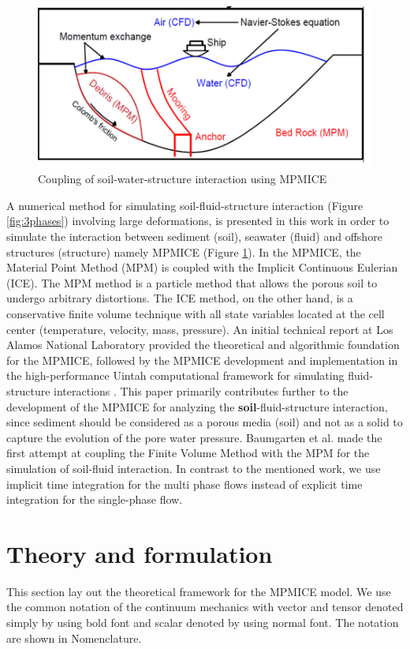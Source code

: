 \documentclass[preprint,12pt]{elsarticle}
\begin{document}
%
%
\begin{figure}[h]
\center
\includegraphics[scale=.4]{MPMICE.jpg}
\caption{Coupling of soil-water-structure interaction using MPMICE}
\label{fig:MPMICE}
\end {figure}
%
%

A numerical method for simulating soil-fluid-structure interaction (Figure \ref{fig:3phases}) involving large deformations, is presented in this work in order to simulate the interaction between sediment (soil), seawater (fluid) and offshore structures (structure) namely MPMICE (Figure \ref{fig:MPMICE}). In the MPMICE, the Material Point Method (MPM) is coupled with the Implicit Continuous Eulerian (ICE). The MPM method is a particle method that allows the porous soil to undergo arbitrary distortions. The ICE method, on the other hand, is a conservative finite volume technique with all state variables located at the cell center (temperature, velocity, mass, pressure). An initial technical report \cite{Kashiwa} at Los Alamos National Laboratory provided the theoretical and algorithmic foundation for the MPMICE, followed by the MPMICE development and implementation in the high-performance Uintah computational framework for simulating fluid-structure interactions \cite{MPMICE}. This paper primarily contributes further to the development of the MPMICE for analyzing the \textbf{soil}-fluid-structure interaction, since sediment should be considered as a porous media (soil) and not as a solid to capture the evolution of the pore water pressure. Baumgarten et al. \cite{Baumgarten2021} made the first attempt at coupling the Finite Volume Method with the MPM for the simulation of soil-fluid interaction. In contrast to the mentioned work, we use implicit time integration for the multi phase flows instead of explicit time integration for the single-phase flow.

\section{\textsf{Theory and formulation}}
This section lay out the theoretical framework for the MPMICE model. We use the common notation of the continuum mechanics with vector and tensor denoted simply by using bold font and scalar denoted by using normal font. The notation are shown in Nomenclature.
\end{document}
